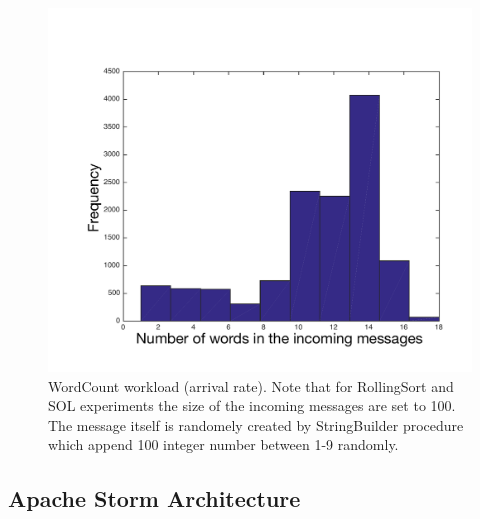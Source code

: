 \documentclass[letter]{vldb}
\begin{document}
\begin{table}[h!]
	\centering
	\caption{Cassandra benchmark specification.}
	\label{tab:ycsb}
	\end{table}

\begin{figure}[h!]
	\begin{center}
		\includegraphics[width=0.7\columnwidth]{figures/hist-arrival-lenght1}
		\caption{{\sf WordCount} workload (arrival rate). Note that for {\sf RollingSort} and {\sf SOL} experiments the size of the incoming messages are set to 100. The message itself is randomely created by {\sf StringBuilder} procedure which append 100 integer number between 1-9 randomly.}
		\label{fig:wc-arrival}
	\end{center}
\end{figure}



\subsection{Apache Storm Architecture}
\end{document}
